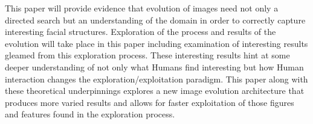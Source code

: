 This paper will provide evidence that evolution of images need not only a directed search but an understanding of the domain in order to correctly capture
interesting facial structures. Exploration of the process and results of the evolution will take place in this paper including examination of interesting
results gleamed from this exploration process. These interesting results hint at some deeper understanding of not only what Humans find interesting but how Human 
interaction changes the exploration/exploitation paradigm. This paper along with these theoretical underpinnings explores a new image evolution architecture
that produces more varied results and allows for faster exploitation of those figures and features found in the exploration process.